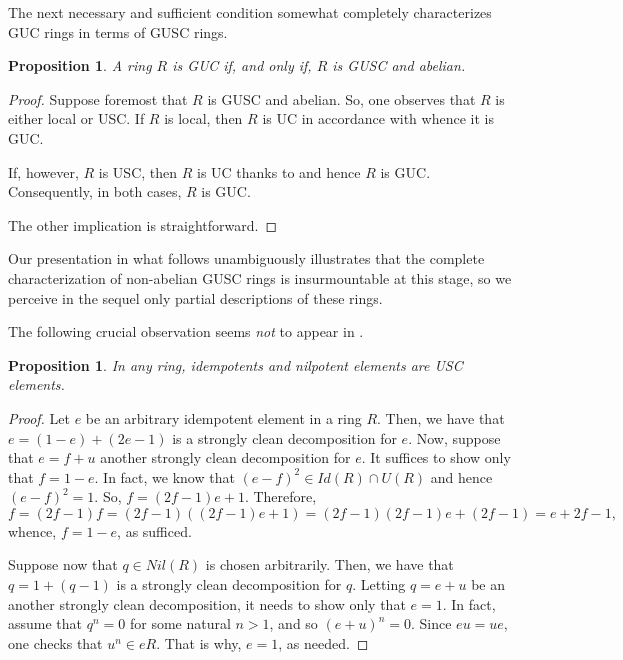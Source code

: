 \documentclass[12pt]{amsart}
\newtheorem{proposition}[theorem]{Proposition}
\theoremstyle{definition}
\begin{document}
The next necessary and sufficient condition somewhat completely characterizes GUC rings in terms of GUSC rings.

\begin{proposition}\label{prop2.9}
A ring $R$ is GUC if, and only if, $R$ is GUSC and abelian.
\end{proposition}

\begin{proof}
Suppose foremost that $R$ is GUSC and abelian. So, one observes that $R$ is either local or USC. If $R$ is local, then $R$ is UC in accordance with \cite[Example 2.8]{1} whence it is GUC.

If, however, $R$ is USC, then $R$ is UC thanks to \cite[Example 4]{2} and hence $R$ is GUC. Consequently, in both cases, $R$ is GUC.

The other implication is straightforward.
\end{proof}

Our presentation in what follows unambiguously illustrates that the complete characterization of non-abelian GUSC rings is insurmountable at this stage, so we perceive in the sequel only partial descriptions of these rings.

\medskip

The following crucial observation seems {\it not} to appear in \cite{1}.

\begin{proposition}\label{pro2.2}
In any ring, idempotents and nilpotent elements are USC elements.
\end{proposition}

\begin{proof}
Let $e$ be an arbitrary idempotent element in a ring $R$. Then, we have that $e=(1-e)+(2e-1)$ is a strongly clean decomposition for $e$. Now, suppose that $e=f+u$ another strongly clean decomposition for $e$. It suffices to show only that $f=1-e$. In fact, we know that $(e-f)^2\in Id(R)\cap U(R)$ and hence $(e-f)^2=1$. So, $f=(2f-1)e+1$. Therefore, $$f=(2f-1)f=(2f-1)((2f-1)e+1)=(2f-1)(2f-1)e+(2f-1)=e+2f-1,$$ whence, $f=1-e$, as sufficed.

Suppose now that $q\in Nil(R)$ is chosen arbitrarily. Then, we have that $q=1+(q-1)$ is a strongly clean decomposition for $q$. Letting $q=e+u$ be an another strongly clean decomposition, it needs to show only that $e=1$. In fact, assume that $q^n=0$ for some natural $n>1$, and so $(e+u)^n=0$. Since $eu=ue$, one checks that $u^n\in eR$. That is why, $e=1$, as needed.
\end{proof}
\end{document}
